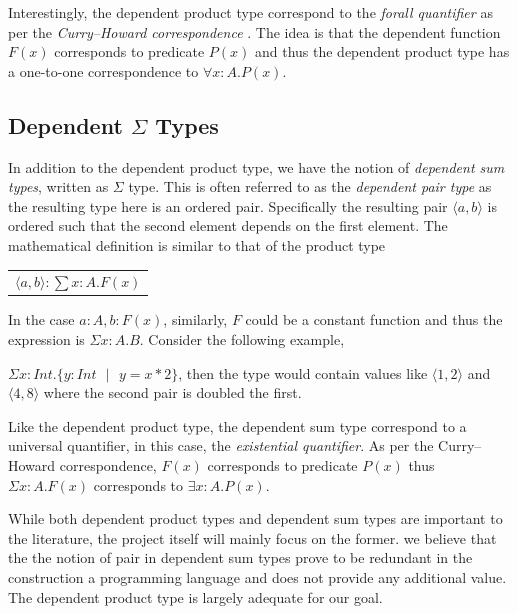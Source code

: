 \documentclass[a4paper,12pt]{report}
\begin{document}
\par
Interestingly, the dependent product type correspond to the 
\textit{forall quantifier} as per 
the \textit{Curry–Howard correspondence} \cite{cHoward}. The idea is that the dependent 
function $F(x)$ corresponds to predicate $P(x)$ and thus the dependent product 
type has a one-to-one correspondence to $\forall x: A. P(x)$.

\subsection{Dependent $\Sigma$ Types}
In addition to the dependent product type, we have the notion of \textit{dependent sum 
types}, written as $\Sigma$ type. This is often referred to as the 
\textit{dependent pair type} as the resulting type here is an ordered pair. 
Specifically the resulting pair $\langle a,b \rangle$ is ordered such that the 
second element depends on the first element. The 
mathematical definition is similar to that of the product type
\begin{center}
 \begin{tabular}{l}
   $\langle a,b \rangle :\sum x: A.  F(x)$
 \end{tabular} 
\end{center}
In the case $a:A, b: F(x)$, similarly, $F$ could be a constant function and thus 
the expression is $\Sigma x:A.B$. Consider the following example, 

$\Sigma x: Int.\{y:Int\text{ }|\text{ } y = x * 2\}$, then the type would 
contain values like $\langle 1,2 \rangle$ and $\langle 4,8 \rangle$ where the 
second pair is doubled the first.

\par
Like the dependent product type, the dependent sum type correspond to a 
universal quantifier, in this case, the \textit{existential quantifier}. As 
per the Curry–Howard correspondence, $F(x)$ corresponds to predicate $P(x)$ 
thus $\Sigma x:A.F(x)$ corresponds to $\exists x: A. P(x)$.

\par
While both dependent product types and dependent sum types are important to the 
literature, the project itself will mainly focus on the former. we believe that 
the the notion of pair in dependent sum types prove to be redundant in 
the construction a programming language and does not provide any additional 
value. The dependent product type is largely adequate for our goal.
\end{document}
